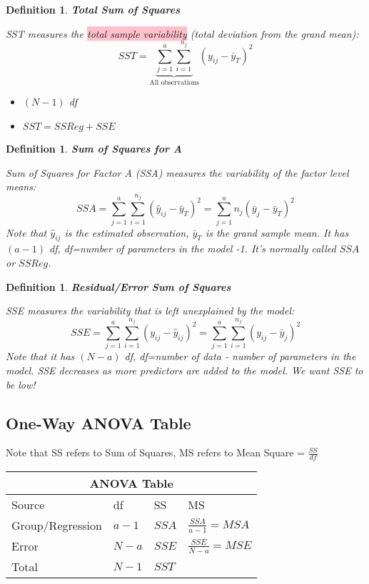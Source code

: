 \documentclass[a4paper,11pt]{article}
\newtheorem{defn}[thm]{Definition}
\begin{document}
\begin{defn}
\normalfont
\textbf{Total Sum of Squares}

SST measures the \colorbox{pink}{total sample variability} (total deviation from the grand mean):
$$SST=\underbrace{\sum_{j=1}^a\sum_{i=1}^{n_j}}_{\text{All observations}}(y_{ij}-\bar{y}_T)^2$$
\begin{itemize}
\item $(N-1)$ df
\item $SST=SSReg+SSE$
\end{itemize}

\end{defn}

\begin{defn}
\normalfont
\textbf{Sum of Squares for A}

Sum of Squares for Factor A (SSA) measures the variability of the factor level means: 
$$SSA=\sum_{j=1}^a\sum_{i=1}^{n_j}(\hat{y}_{ij}-\bar{y}_T)^2=\sum_{j=1}^an_j(\bar{y}_j-\bar{y}_T)^2$$
Note that $\hat{y}_{ij}$ is the estimated observation, $\bar{y}_T$ is the grand sample mean. It has $(a-1)$ df, df=number of parameters in the model -1. It's normally called $SSA$ or $SSReg$. 

\end{defn}

\begin{defn}
\normalfont
\textbf{Residual/Error Sum of Squares}

SSE measures the variability that is left unexplained by the model: 
$$SSE=\sum_{j=1}^a\sum_{i=1}^{n_j}(y_{ij}-\hat{y}_{ij})^2=\sum_{j=1}^a\sum_{i=1}^{n_j}(y_{ij}-\bar{y}_j)^2$$
Note that it has $(N-a)$ df, df=number of data - number of parameters in the model. SSE decreases as more predictors are added to the model. We want SSE to be low! 
\end{defn}

\subsection{One-Way ANOVA Table}
Note that SS refers to Sum of Squares, MS refers to Mean Square = $\frac{SS}{df}$
\begin{center}
\begin{tabular}{ |p{3cm}||p{3cm}|p{3cm}|p{3cm}|  }
 \hline
 \multicolumn{4}{|c|}{ANOVA Table} \\
 \hline
 Source & df &SS&MS\\
 \hline
 Group/Regression   & $a-1$    &$SSA$&   $\frac{SSA}{a-1}=MSA$\\
 Error &   $N-a$  & $SSE$   & $\frac{SSE}{N-a}=MSE$\\
 \hline
 Total &$N-1$ & $SST$ &  \\
 \hline
\end{tabular}
\end{center}
\vspace{18pt}
\end{document}
